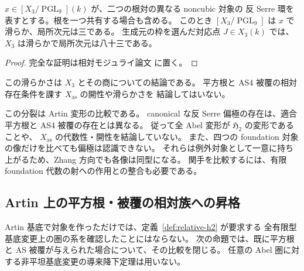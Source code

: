 \begin{corollary}[非一致根対での関係式空間の滑らかさ]
\label{cor:artin-noncubic-relations-smooth}
$x\in[X_3/\operatorname{PGL}_9](k)$ が、二つの根対の異なる noncubic 対象の
反 Serre 環を表すとする。根を一つ共有する場合も含める。
このとき $[X_3/\operatorname{PGL}_9]$ は $x$ で滑らか、局所次元は三である。
生成元の枠を選んだ対応点 $J\in X_3(k)$ では、$X_3$ は滑らかで局所次元は八十三である。
\end{corollary}
\begin{proof}
完全な証明は相対モジュライ論文 \cite[\texttt{artin_foundation}]{QuadricModuli2026} に置く。
\end{proof}

この滑らかさは $X_3$ とその商についての結論である。
平方根と AS4 被覆の相対存在条件を課す $X_{\mathrm{as}}$ の開性や滑らかさを
結論してはいない。

\begin{remark}
この分裂は Artin 変形の比較である。
canonical な反 Serre 偏極の存在は、適合平方根と AS4 被覆の存在とは異なる。
従って全 Abel 変形が $\mathfrak H_2$ の変形であることや、
$X_{\mathrm{as}}$ の代数性・開性を結論していない。
また、四つの foundation 対象の像だけを比べても偏極は認識できない。
それらは例外対象として一意に持ち上がるため、Zhang 方向でも各像は同型になる。
関手を比較するには、有限 foundation 代数の射への作用との整合も必要である。
\end{remark}

\subsection{Artin 上の平方根・被覆の相対族への昇格}
\label{subsec:artin-relative-promotion}

Artin 基底で対象を作っただけでは、定義~\ref{def:relative-h2} が要求する
全有限型基底変更上の圏の系を確認したことにはならない。
次の命題では、既に平方根と AS 被覆が与えられた場合について、その比較を閉じる。
任意の Abel 圏に対する非平坦基底変更の導来降下定理は用いない。

